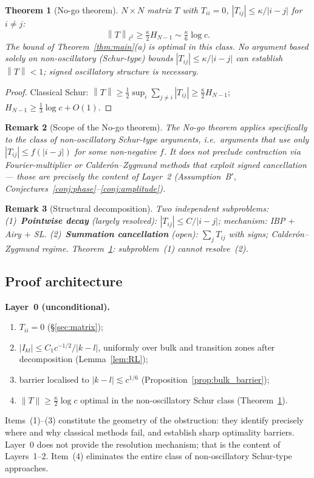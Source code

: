 \documentclass[12pt,a4paper]{article}
\newtheorem{theorem}{Theorem}[section]
\newtheorem{remark}[theorem]{Remark}
\newcommand{\norm}[1]{\left\|#1\right\|}
\begin{document}
\begin{theorem}[No-go theorem]\label{thm:nogo}
$N\times N$ matrix $T$ with $T_{ii}=0$,
$|T_{ij}|\leq\kappa/|i-j|$ for $i\neq j$:
\[
  \norm{T}_{\ell^2}\geq\tfrac{\kappa}{2}H_{N-1}\sim\tfrac{\kappa}{6}\log c.
\]
The bound of Theorem~\ref{thm:main}(a) is optimal in this class.
No argument based solely on non-oscillatory \textup{(}Schur-type\textup{)}
bounds $|T_{ij}|\leq\kappa/|i-j|$ can establish
$\norm{T}<1$; signed oscillatory structure is necessary.
\end{theorem}

\begin{proof}
Classical Schur: $\norm{T}\geq\tfrac{1}{2}\sup_i\sum_{j\neq i}|T_{ij}|
\geq\tfrac{\kappa}{2}H_{N-1}$; $H_{N-1}\geq\tfrac{1}{3}\log c+O(1)$.
\end{proof}

\begin{remark}[Scope of the No-go theorem]\label{rem:nogo_scope}
The No-go theorem applies specifically to the class of
non-oscillatory Schur-type arguments, i.e.\ arguments that
use only $|T_{ij}|\leq f(|i-j|)$ for some non-negative $f$.
It does not preclude contraction via Fourier-multiplier or
Calder\'{o}n--Zygmund methods that exploit signed cancellation
--- those are precisely the content of Layer~2
(Assumption~B$'$, Conjectures~\ref{conj:phase}--\ref{conj:amplitude}).
\end{remark}

\begin{remark}[Structural decomposition]\label{rem:decomposition}
Two independent subproblems:
(1)~\textbf{Pointwise decay} (largely resolved):
$|T_{ij}|\leq C/|i-j|$; mechanism: IBP $+$ Airy $+$ SL.
(2)~\textbf{Summation cancellation} (open):
$\sum_j T_{ij}$ with signs; Calder\'{o}n--Zygmund regime.
Theorem~\ref{thm:nogo}: subproblem~(1) cannot resolve~(2).
\end{remark}

\subsection{Proof architecture}
\label{sec:architecture}

\textbf{Layer~0 (unconditional).}
\begin{enumerate}[nosep,label=(\arabic*)]
  \item $T_{ii}=0$ (\S\ref{sec:matrix});
  \item $|I_{kl}|\leq C_1c^{-1/2}/|k-l|$, uniformly over bulk
        and transition zones after decomposition
        (Lemma~\ref{lem:RL});
  \item barrier localised to $|k-l|\lesssim c^{1/6}$
        (Proposition~\ref{prop:bulk_barrier});
  \item $\|T\|\geq\tfrac{\kappa}{2}\log c$ optimal in the
        non-oscillatory Schur class
        (Theorem~\ref{thm:nogo}).
\end{enumerate}
Items~(1)--(3) constitute the geometry of the obstruction:
they identify precisely where and why classical methods fail,
and establish sharp optimality barriers.
Layer~0 does not provide the resolution mechanism;
that is the content of Layers~1--2.
Item~(4) eliminates the entire class of non-oscillatory
Schur-type approaches.
\end{document}
